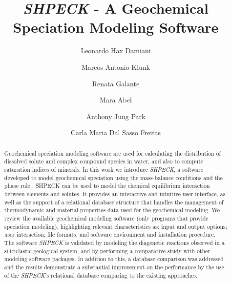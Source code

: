 \documentclass[preprint,12pt,3p]{elsarticle}
\begin{document}
\begin{frontmatter}

\title{\emph{SHPECK} - A Geochemical Speciation Modeling Software}

\author[label1]{Leonardo Hax Damiani}
\address[label1]{Institute of Informatics, UFRGS, Porto Alegre, RS, Brazil}



\author[label2]{Marcos Antonio Klunk}
\address[label2]{Institute of Geoscience, UFRGS, Porto Alegre, RS, Brazil}

\author[label1]{Renata Galante}

\author[label1]{Mara Abel}

\author[label3]{Anthony Jung Park}
\address[label3]{Sienna Geodynamics, Albany, NY, USA}

\author[label1]{Carla Maria Dal Sasso Freitas}

\begin{abstract}
Geochemical speciation modeling software are used for calculating the distribution of dissolved solute and complex compound species in water, and also to compute saturation indices of minerals. In this work we introduce \emph{SHPECK}, a software developed to model geochemical speciation using the mass-balance conditions and the phase rule \cite{Garrels:65}. SHPECK can be used to model the chemical equilibrium interaction between elements and solutes. It provides an interactive and intuitive user interface, as well as the support of a relational database structure that handles the management of thermodynamic and material properties data used for the geochemical modeling. We review the available geochemical modeling software (only programs that provide speciation modeling), highlighting relevant characteristics as: input and output options; user interaction; file formats; and software environment and installation procedure. The software \emph{SHPECK} is validated by modeling the diagenetic reactions observed in a siliciclastic geological system, and by performing a comparative study with other modeling software packages. In addition to this, a database comparison was addressed and the results demonstrate a substantial improvement on the performance by the use of the \emph{SHPECK}'s relational database comparing to the existing approaches.
\end{abstract}


\end{frontmatter}
\end{document}
